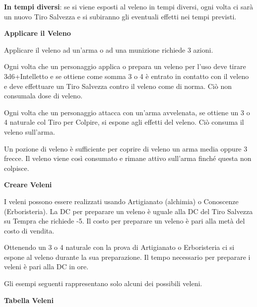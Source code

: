 \documentclass[a4paper,11pt,twoside,openany]{book}
\begin{document}
\textbf{In tempi diversi}: se si viene esposti al veleno in tempi diversi, ogni volta ci sarà un nuovo Tiro Salvezza e si subiranno gli eventuali effetti nei tempi previsti.

\bigskip

\textbf{Applicare il Veleno}

Applicare il veleno ad un'arma o ad una munizione richiede 3 azioni.

Ogni volta che un personaggio applica o prepara un veleno per l'uso deve tirare 3d6+Intelletto e se ottiene come somma 3 o 4 è entrato in contatto con il veleno e deve effettuare un Tiro Salvezza contro il veleno come di norma. Ciò non consumala dose di veleno.

Ogni volta che un personaggio attacca con un'arma avvelenata, se ottiene un 3 o 4 naturale col Tiro per Colpire, si espone agli effetti del veleno. Ciò consuma il veleno sull'arma.

Un pozione di veleno è sufficiente per coprire di veleno un arma media oppure 3 frecce. Il veleno viene così consumato e rimane attivo sull'arma finché questa non colpisce.

\textbf{Creare Veleni}

I veleni possono essere realizzati usando Artigianato (alchimia) o Conoscenze (Erboristeria). La DC per preparare un veleno è uguale alla DC del Tiro Salvezza su Tempra che richiede -5. Il costo per preparare un veleno è pari alla metà del costo di vendita.

Ottenendo un 3 o 4 naturale con la prova di Artigianato o Erboristeria ci si espone al veleno durante la sua preparazione. Il tempo necessario per preparare i veleni è pari alla DC in ore.

Gli esempi seguenti rappresentano solo alcuni dei possibili veleni.
\bigskip

\textbf{Tabella Veleni}

\medskip
\end{document}
